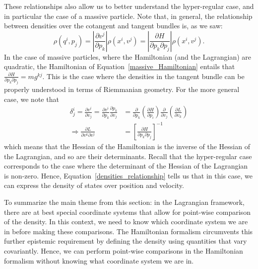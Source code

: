 \documentclass[letterpaper]{article}
\begin{document}
These relationships also allow us to better understand the hyper-regular case, and in particular the case of a massive particle. Note that, in general, the relationship between densities over the cotangent and tangent bundles is, as we saw:
\begin{equation} \label{densities_relationship}
\rho(q^i, p_j) = \left|\frac{\partial v^j}{\partial p_k}\right| \rho(x^i, v^j)  = \left|\frac{\partial H}{\partial p_k \partial p_j}\right| \rho(x^i, v^j).
\end{equation}
In the case of massive particles, where the Hamiltonian (and the Lagrangian) are quadratic, the Hamiltonian of Equation~\ref{massive_Hamiltonian} entails that $\frac{\partial H}{\partial p_k \partial p_j} = m g^{kj}$. This is the case where the densities in the tangent bundle can be properly understood in terms of Riemmanian geometry. For the more general case, we note that
\begin{equation}
\begin{aligned}
\delta^i_j = \frac{\partial v^i}{\partial v_j} = \frac{\partial v^i}{\partial p_k}\frac{\partial p_k}{\partial v_j} &= \frac{\partial}{\partial p_k}\left(\frac{\partial H}{\partial p_i}\right) \frac{\partial }{\partial v_j} \left( \frac{\partial L}{\partial v_k} \right) \\
\Rightarrow \frac{\partial L}{\partial v^k \partial v^j} &= \left[ \frac{\partial H}{\partial p_k \partial p_j} \right]^{-1}
\end{aligned}
\end{equation}
which means that the Hessian of the Hamiltonian is the inverse of the Hessian of the Lagrangian, and so are their determinants. Recall that the hyper-regular case corresponds to the case where the determinant of the Hessian of the Lagrangian is non-zero. Hence, Equation~\ref{densities_relationship} tells us that in this case, we can express the density of states over position and velocity.

To summarize the main theme from this section: in the Lagrangian framework, there are at best special coordinate systems that allow for point-wise comparison of the density. In this context, we need to know which coordinate system we are in before making these comparisons. The Hamiltonian formalism circumvents this further epistemic requirement by defining the density using quantities that vary covariantly. Hence, we can perform point-wise comparisons in the Hamiltonian formalism without knowing what coordinate system we are in.
\end{document}
